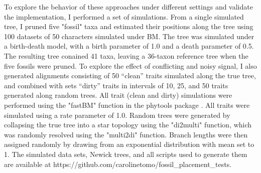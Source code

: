 \documentclass[12pt]{article}
\begin{document}
To explore the behavior of these approaches under different settings and 
validate the implementation, I performed a set of simulations. From a
single simulated tree, I pruned five "fossil" taxa and
estimated their positions along the tree using 100 datasets of 50
characters simulated under BM. The tree was simulated under a
birth-death model, with a birth parameter of 1.0 and a death parameter
of 0.5. The resulting tree conained 41 taxa,
leaving a 36-taxon reference tree when the five fossils were pruned. To
explore the effect of conflicting and noisy signal, I also generated
alignments consisting of 50 ``clean'' traits simulated along the true
tree, and combined with sets ``dirty'' traits in intervals of
10, 25, and 50 traits generated along random trees. All trait (clean and dirty) simulations were
performed using the "fastBM" function in the phytools package \citep{revell2012phytools}. 
All traits were simulated using a rate parameter of 1.0. Random trees
were generated by collapsing the true tree into a star topology using
the "di2multi" function, which was randomly resolved using the "multi2di" function.
Branch lengths were then assigned randomly by drawing from an exponential
distribution with mean set to 1. The simulated data sets, Newick trees, and all scripts used
to generate them are available at https://github.com/carolinetomo/fossil\_placement\_tests. 
\end{document}

